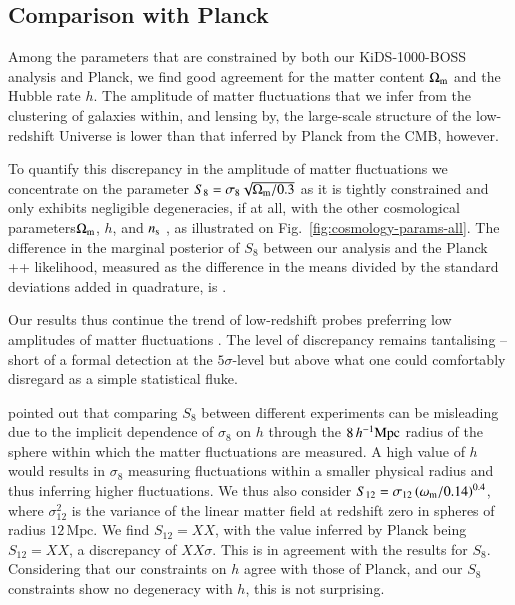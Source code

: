 \subsection{Comparison with Planck}
\label{sec:planck_comp}
Among the parameters that are constrained by both our KiDS-1000-BOSS \tttp analysis and Planck, we find good agreement for the matter content $\Omega_{\rm m}$ and the Hubble rate $h$. 
The amplitude of matter fluctuations that we infer from the clustering of galaxies within, and lensing by, the large-scale structure of the low-redshift Universe is lower than that inferred by Planck from the CMB, however. 

To quantify this discrepancy in the amplitude of matter fluctuations we concentrate on the parameter $S_{8} = \sigma_8 \sqrt{\Omega_{\rm m}/0.3}$ as it is tightly constrained and only exhibits negligible degeneracies, if at all, with the other cosmological parameters$\Omega_{\rm m}$, $h$, and $n_{\rm s}$ , as illustrated on Fig.~\ref{fig:cosmology-params-all}. 
%
The difference in the marginal posterior of $S_{8}$ between our \tttp analysis and the Planck ++ likelihood, measured as the difference in the means divided by the standard deviations added in quadrature, is . 

Our results thus continue the trend of low-redshift probes preferring low amplitudes of matter fluctuations .  The level of discrepancy remains tantalising -- short of a formal detection at the $5\sigma$-level but above what one could comfortably disregard as a simple statistical fluke.

\citet{Sanchez2020} pointed out that comparing $S_{8}$ between different experiments can be misleading due to the implicit dependence of $\sigma_{8}$ on $h$ through the $8\,h^{-1}{\rm Mpc}$ radius of the sphere within which the matter fluctuations are measured. 
A high value of $h$ would results in $\sigma_{8}$ measuring fluctuations within a smaller physical radius and thus inferring higher fluctuations. 
We thus also consider $S_{12} = \sigma_{12}\left(\omega_{\rm m}/0.14\right)^{0.4}$, where $\sigma_{12}^{2}$ is the variance of the linear matter field at redshift zero in spheres of radius $12\,\mathrm{Mpc}$.
We find $S_{12} = XX$, with the value inferred by Planck being $S_{12} = XX$, a discrepancy of $XX\sigma$. 
This is in agreement with the results for $S_{8}$. 
Considering that our \tttp constraints on $h$ agree with those of Planck, and our $S_{8}$ constraints show no degeneracy with $h$, this is not surprising. 

